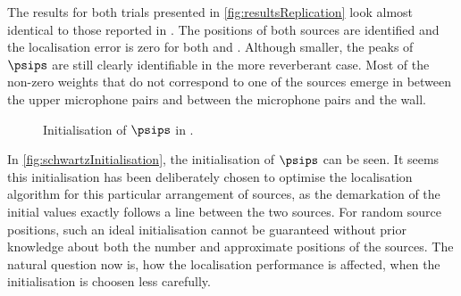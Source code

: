 The results for both trials presented in \autoref{fig:resultsReplication} look almost identical to those reported in \cite{Schwartz2014}. The positions of both sources are identified and the localisation error is zero for both  and . Although smaller, the peaks of $\psips$ are still clearly identifiable in the more reverberant case. Most of the non-zero weights that do not correspond to one of the sources emerge in between the upper microphone pairs and between the microphone pairs and the wall. 

\begin{figure}[!htbp]
	\iftoggle{quick}{%
		\texttt{[image: plots/schwartz2014/s=2-sloc=schwartz2014-T60=0.4-prior=schwartz2014-overview-sc]}
	}{%
		\setlength{\figurewidth}{\textwidth}
		\setlength{\figureheight}{0.3\textheight}
		
	}
    \caption[Initialisation of $\psips$ in \cite{Schwartz2014}]{Initialisation of $\psips$ in \cite{Schwartz2014}.}
    \label{fig:schwartzInitialisation}
\end{figure}

%		

\FloatBarrier

In \autoref{fig:schwartzInitialisation}, the initialisation of $\psips$ can be seen. It seems this initialisation has been deliberately chosen to optimise the localisation algorithm for this particular arrangement of sources, as the demarkation of the initial values exactly follows a line between the two sources. For random source positions, such an ideal initialisation cannot be guaranteed without prior knowledge about both the number and approximate positions of the sources. The natural question now is, how the localisation performance is affected, when the initialisation is choosen less carefully.